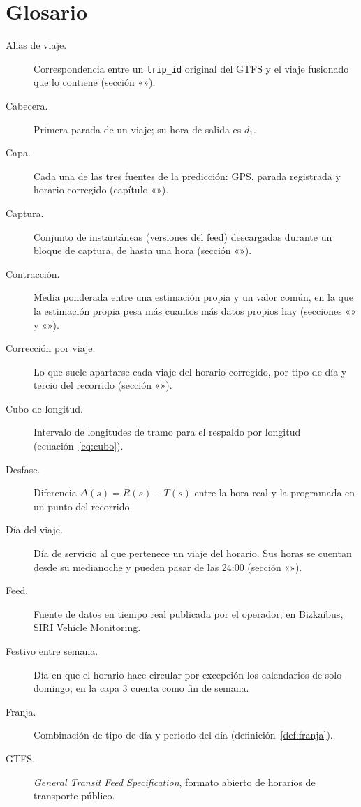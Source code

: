 \chapter{Glosario}
\label{ap:glosario}

\begin{description}
  \item[Alias de viaje.] Correspondencia entre un \texttt{trip\_id} original del GTFS y el viaje fusionado que lo
        contiene (sección «»).
  \item[Cabecera.] Primera parada de un viaje; su hora de salida es $d_1$.
  \item[Capa.] Cada una de las tres fuentes de la predicción: GPS, parada registrada y horario corregido
        (capítulo «»).
  \item[Captura.] Conjunto de instantáneas (versiones del feed) descargadas durante un bloque de captura, de hasta una hora
        (sección «»).
  \item[Contracción.] Media ponderada entre una estimación propia y un valor común, en la que la estimación propia pesa
        más cuantos más datos propios hay (secciones «» y «»).
  \item[Corrección por viaje.] Lo que suele apartarse cada viaje del horario corregido, por tipo de día y tercio del
        recorrido (sección «»).
  \item[Cubo de longitud.] Intervalo de longitudes de tramo para el respaldo por longitud
        (ecuación~\eqref{eq:cubo}).
  \item[Desfase.] Diferencia $\Delta(s)=R(s)-T(s)$ entre la hora real y la programada en un punto del recorrido.
  \item[Día del viaje.] Día de servicio al que pertenece un viaje del horario. Sus horas se cuentan desde su medianoche
        y pueden pasar de las 24:00 (sección «»).
  \item[Feed.] Fuente de datos en tiempo real publicada por el operador; en Bizkaibus, SIRI Vehicle Monitoring.
  \item[Festivo entre semana.] Día en que el horario hace circular por excepción los calendarios de solo domingo; en la
        capa 3 cuenta como fin de semana.
  \item[Franja.] Combinación de tipo de día y periodo del día (definición~\ref{def:franja}).
  \item[GTFS.] \emph{General Transit Feed Specification}, formato abierto de horarios de transporte público.

\end{description}
